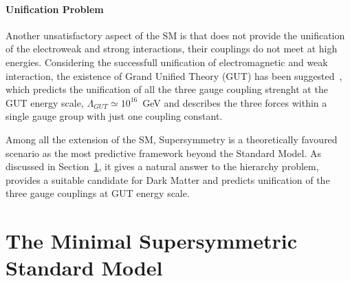 \paragraph{Unification Problem}	Another unsatisfactory aspect of the SM is that does not provide the unification of the electroweak and strong interactions,
	their couplings do not meet at high energies. Considering the successfull unification of electromagnetic and weak
	interaction, the existence of Grand Unified Theory (GUT) has been 
	suggested~\cite{GUT1,GUT2}, which predicts the unification of all the three gauge coupling strenght at the GUT energy scale,
	$\Lambda_{GUT} \simeq 10^{16}$~GeV and describes the three forces within a single gauge group with just one coupling constant.

Among all the extension of the SM, Supersymmetry is a theoretically favoured scenario as the most predictive framework beyond the Standard Model.
As discussed in Section~\ref{sec:MSSM}, it gives a natural answer to the hierarchy problem, provides a suitable candidate for Dark Matter
and predicts unification of the three gauge couplings at GUT energy scale.


%
%

 
\section{The Minimal Supersymmetric Standard Model}\label{sec:MSSM}
